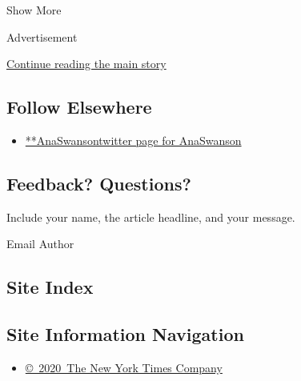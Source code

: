 Show More

Advertisement

\protect\hyperlink{after-mid2}{Continue reading the main story}

\hypertarget{follow-elsewhere}{%
\subsection{Follow Elsewhere}\label{follow-elsewhere}}

\begin{itemize}
\tightlist
\item
  \href{https://twitter.com/AnaSwanson}{**AnaSwansontwitter page for
  AnaSwanson}
\end{itemize}

\hypertarget{feedback-questions}{%
\subsection{Feedback? Questions?}\label{feedback-questions}}

Include your name, the article headline, and your message.

Email Author

\hypertarget{site-index}{%
\subsection{Site Index}\label{site-index}}

\hypertarget{site-information-navigation}{%
\subsection{Site Information
Navigation}\label{site-information-navigation}}

\begin{itemize}
\tightlist
\item
  \href{https://help.nytimes.com/hc/en-us/articles/115014792127-Copyright-notice}{©~2020~The
  New York Times Company}
\end{itemize}

